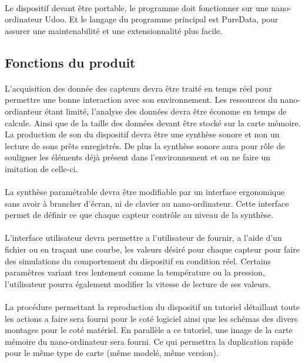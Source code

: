 \documentclass[a4paper, titlepage, oneside, 12pt]{article}%
\begin{document}
\paragraph{}
Le dispositif devant être portable, le programme doit fonctionner sur une nano-ordinateur Udoo. Et le langage du programme principal est PureData, pour assurer une maintenabilité et une extensionnalité plus facile.



\subsection{Fonctions du produit}
\paragraph{}
L’acquisition des donnée des capteurs devra être traité en temps réel pour permettre une bonne interaction avec son environnement. Les ressources du nano-ordianteur étant limité, l'analyse des données devra être économe en temps de calcule. Ainsi que de la taille des données devant être stocké sur la carte mémoire.\\
La production de son du dispositif devra être une synthèse sonore et non un lecture de sons prêts enregistrés. De plus la synthèse sonore aura pour rôle de souligner les éléments déjà présent dans l’environnement  et on ne faire un imitation de celle-ci.

\paragraph{}
La synthèse paramétrable devra être modifiable par un interface ergonomique sans avoir à brancher d’écran, ni de clavier au nano-ordinateur. Cette interface permet de définir ce que chaque capteur contrôle au niveau de la synthèse.

\paragraph{}
L'interface utilisateur devra permettre a l'utilisateur de fournir, a l'aide d'un fichier ou en traçant une courbe, les valeurs désiré pour chaque capteur pour faire des simulations du comportement du dispositif en condition réel. Certains paramètres variant tres lentement comme la température ou la pression, l'utilisateur pourra également modifier la vitesse de lecture de ses valeurs.

\paragraph{}
La procédure permettant la reproduction du dispositif un tutoriel détaillant toute les actions a faire sera fourni pour le coté logiciel ainsi que les schémas des divers montages pour le coté matériel. En parallèle a ce tutoriel, une image de la carte mémoire du nano-ordinateur sera fourni. Ce qui permettra la duplication rapide pour le même type de carte (même modelé, même version).
\end{document}

